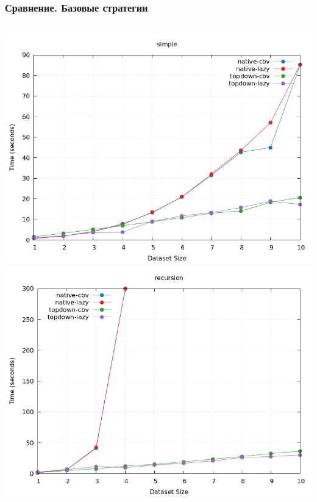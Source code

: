 \documentclass{beamer}
\begin{document}
\begin{frame}\frametitle{Сравнение. Базовые стратегии}
  \begin{columns}
    \includegraphics[width=\textwidth]{basic_simple.png}
    \includegraphics[width=\textwidth]{basic_recursion.png}
  \end{columns}


\end{frame}
\end{document}
